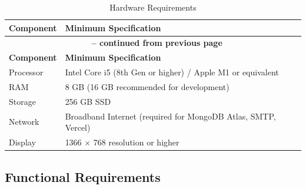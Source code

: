 \documentclass[12pt,a4paper]{report}
\begin{document}
\begin{longtable}{|p{3.5cm}|p{9cm}|}
\caption{Hardware Requirements} \\
\hline
\textbf{Component} & \textbf{Minimum Specification}\\
\hline
\endfirsthead
\multicolumn{2}{c}{{\bfseries \tablename\ \thetable{} -- continued from previous page}} \\
\hline
\textbf{Component} & \textbf{Minimum Specification}\\
\hline
\endhead
Processor & Intel Core i5 (8th Gen or higher) / Apple M1 or equivalent\\
\hline
RAM & 8 GB (16 GB recommended for development)\\
\hline
Storage & 256 GB SSD\\
\hline
Network & Broadband Internet (required for MongoDB Atlas, SMTP, Vercel)\\
\hline
Display & 1366 $\times$ 768 resolution or higher\\
\hline
\end{longtable}

\subsection{Functional Requirements}
\end{document}
